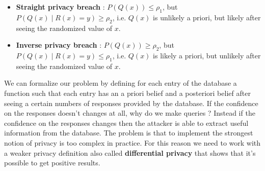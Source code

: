 \begin{itemize}
\item \textbf{Straight privacy breach} : $P(Q(x)) \leq \rho_{1}$, but $P(Q(x) \mid R(x) = y) \geq \rho_{2}$, i.e. $Q(x)$ is unlikely a priori, but likely after seeing the randomized value of $x$.
\item \textbf{Inverse privacy breach} : $P(Q(x)) \geq \rho_{2}$, but $P(Q(x) \mid R(x) = y) \leq \rho_{1}$, i.e. $Q(x)$ is likely a priori, but unlikely after seeing the randomized value of $x$.
\end{itemize}
We can formalize our problem by defining for each entry of the database a function such that each entry has an a priori belief and a posteriori belief after seeing a certain numbers of responses provided by the database. If the confidence on the responses doesn't changes at all, why do we make queries ? Instead if the confidence on the responses changes then the attacker is able to extract useful information from the database. The problem is that to implement the strongest notion of privacy is too complex in practice. For this reason we need to work with a weaker privacy definition also called \textbf{differential privacy} that shows that it's possible to get positive results.


